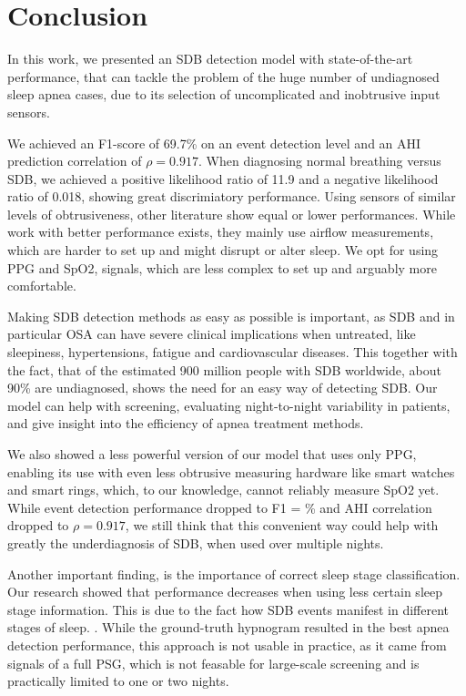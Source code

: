 \chapter{Conclusion \label{Chapter-Conclusion}}

In this work, we presented an SDB detection model with state-of-the-art performance, that can tackle the problem of the huge number of undiagnosed sleep apnea cases, due to its selection of uncomplicated and inobtrusive input sensors.

We achieved an F1-score of 69.7\% on an event detection level and an AHI prediction correlation of $\rho = 0.917$. When diagnosing normal breathing versus SDB, we achieved a positive likelihood ratio of 11.9 and a negative likelihood ratio of 0.018, showing great discrimiatory performance.
Using sensors of similar levels of obtrusiveness, other literature show equal or lower performances.
While work with better performance exists, they mainly use airflow measurements, which are harder to set up and might disrupt or alter sleep. We opt for using PPG and SpO2, signals, which are less complex to set up and arguably more comfortable.

Making SDB detection methods as easy as possible is important, as SDB and in particular OSA can have severe clinical implications when untreated, like sleepiness, hypertensions, fatigue and cardiovascular diseases. This together with the fact, that of the estimated 900 million people with SDB worldwide, about 90\% are undiagnosed, shows the need for an easy way of detecting SDB. Our model can help with screening, evaluating night-to-night variability in patients, and give insight into the efficiency of apnea treatment methods.

We also showed a less powerful version of our model that uses only PPG, enabling its use with even less obtrusive measuring hardware like smart watches and smart rings, which, to our knowledge, cannot reliably measure SpO2 yet.
While event detection performance dropped to F1 = \% and AHI correlation dropped to $\rho = 0.917$, we still think that this convenient way could help with greatly the underdiagnosis of SDB, when used over multiple nights. 

Another important finding, is the importance of correct sleep stage classification. Our research showed that performance decreases when using less certain sleep stage information. This is due to the fact how SDB events manifest in different stages of sleep. . While the ground-truth hypnogram resulted in the best apnea detection performance, this approach is not usable in practice, as it came from signals of a full PSG, which is not feasable for large-scale screening and is practically limited to one or two nights.

